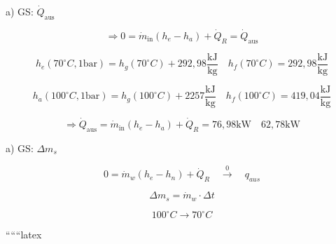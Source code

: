 a) GS: $\dot{Q}_{\text{aus}}$

\[
\Rightarrow 0 = \dot{m}_{\text{in}} (h_e - h_a) + \dot{Q}_R = \dot{Q}_{\text{aus}}
\]

\[
h_e(70^\circ C, 1 \text{bar}) = h_g(70^\circ C) + 292,98 \frac{\text{kJ}}{\text{kg}} \quad h_f(70^\circ C) = 292,98 \frac{\text{kJ}}{\text{kg}}
\]

\[
h_a(100^\circ C, 1 \text{bar}) = h_g(100^\circ C) + 2257 \frac{\text{kJ}}{\text{kg}} \quad h_f(100^\circ C) = 419,04 \frac{\text{kJ}}{\text{kg}}
\]

\[
\Rightarrow \dot{Q}_{\text{aus}} = \dot{m}_{\text{in}} (h_e - h_a) + \dot{Q}_R = 76,98 \text{kW} \quad 62,78 \text{kW}
\]

a) GS: $\Delta m_{s}$

\[
0 = \dot{m}_{w} (h_{e} - h_{n}) + \dot{Q}_{R} \quad \overset{0}{\rightarrow} \quad q_{aus}
\]

\[
\Delta m_{s} = \dot{m}_{w} \cdot \Delta t
\]

\[
100^\circ C \rightarrow 70^\circ C
\]

``````latex